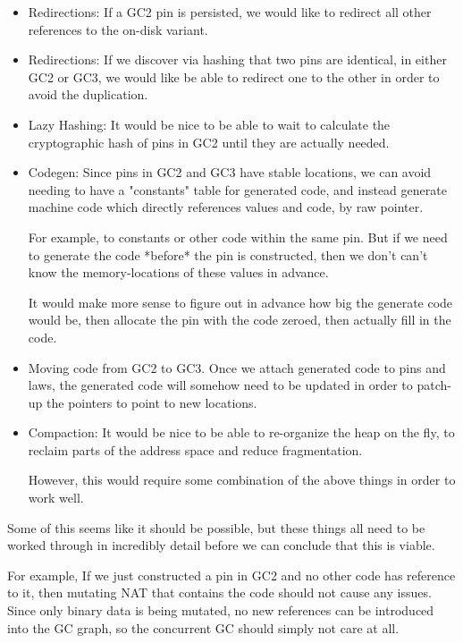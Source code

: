 \begin{itemize}
\item
    Redirections: If a GC2 pin is persisted, we would like to redirect
    all other references to the on-disk variant.
\item
    Redirections: If we discover via hashing that two pins are identical,
    in either GC2 or GC3, we would like be able to redirect one to the
    other in order to avoid the duplication.
\item
    Lazy Hashing: It would be nice to be able to wait to calculate the
    cryptographic hash of pins in GC2 until they are actually needed.
\item
    Codegen: Since pins in GC2 and GC3 have stable locations, we can
    avoid needing to have a "constants" table for generated code, and
    instead generate machine code which directly references values and
    code, by raw pointer.

    For example, to constants or other code within the same pin.  But if
    we need to generate the code *before* the pin is constructed, then
    we don't can't know the memory-locations of these values in advance.

    It would make more sense to figure out in advance how big the generate
    code would be, then allocate the pin with the code zeroed, then
    actually fill in the code.
\item
    Moving code from GC2 to GC3.  Once we attach generated code to pins
    and laws, the generated code will somehow need to be updated in
    order to patch-up the pointers to point to new locations.
\item
    Compaction: It would be nice to be able to re-organize the heap on the
    fly, to reclaim parts of the address space and reduce fragmentation.

    However, this would require some combination of the above things in
    order to work well.
\end{itemize}

Some of this seems like it should be possible, but these things all need
to be worked through in incredibly detail before we can conclude that
this is viable.

For example, If we just constructed a pin in GC2 and no other code
has reference to it, then mutating NAT that contains the code should
not cause any issues.  Since only binary data is being mutated, no new
references can be introduced into the GC graph, so the concurrent GC
should simply not care at all.

